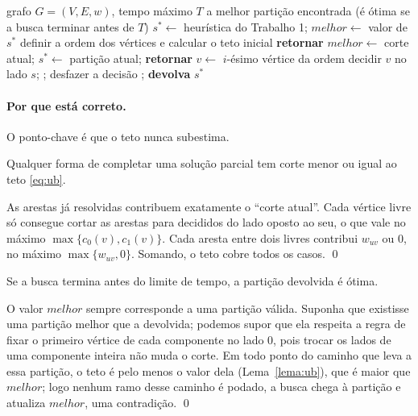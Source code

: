 \begin{algorithm}[ht]
\caption{Branch-and-Bound}\label{alg:bb}
\begin{algorithmic}[1]
\Require grafo $G=(V,E,w)$, tempo máximo $T$
\Ensure a melhor partição encontrada (é ótima se a busca terminar antes de $T$)
\State $s^*\gets$ heurística do Trabalho 1; \quad $\mathit{melhor}\gets$ valor de $s^*$
\State definir a ordem dos vértices e calcular o teto inicial
   \State \textbf{retornar} 
  \EndIf
   \State $\mathit{melhor}\gets$ corte atual; \quad $s^*\gets$ partição atual; \quad \textbf{retornar}
  \EndIf
  \State $v\gets$ $i$-ésimo vértice da ordem
    \State decidir $v$ no lado $s$; \quad {}; \quad desfazer a decisão
  \EndFor
\EndProcedure
\State {}; \quad \textbf{devolva} $s^*$
\end{algorithmic}
\end{algorithm}

\paragraph{Por que está correto.} O ponto-chave é que o teto nunca subestima.

\begin{lema}\label{lema:ub}
Qualquer forma de completar uma solução parcial tem corte menor ou igual ao teto \eqref{eq:ub}.
\end{lema}
\begin{prova}
As arestas já resolvidas contribuem exatamente o ``corte atual''. Cada vértice livre só consegue cortar as arestas para decididos do lado oposto ao seu, o que vale no máximo $\max\{c_0(v),c_1(v)\}$. Cada aresta entre dois livres contribui $w_{uv}$ ou $0$, no máximo $\max\{w_{uv},0\}$. Somando, o teto cobre todos os casos. \qed
\end{prova}

\begin{teorema}[Correção]\label{teo:bb}
Se a busca termina antes do limite de tempo, a partição devolvida é ótima.
\end{teorema}
\begin{prova}
O valor $\mathit{melhor}$ sempre corresponde a uma partição válida. Suponha que existisse uma partição melhor que a devolvida; podemos supor que ela respeita a regra de fixar o primeiro vértice de cada componente no lado 0, pois trocar os lados de uma componente inteira não muda o corte. Em todo ponto do caminho que leva a essa partição, o teto é pelo menos o valor dela (Lema~\ref{lema:ub}), que é maior que $\mathit{melhor}$; logo nenhum ramo desse caminho é podado, a busca chega à partição e atualiza $\mathit{melhor}$, uma contradição. \qed
\end{prova}

